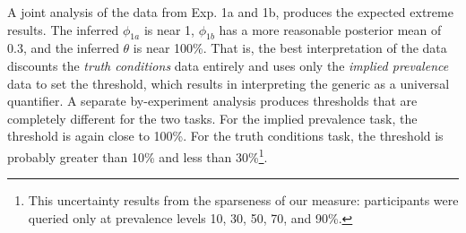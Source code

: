 \documentclass[10pt,letterpaper]{article}
\newcommand{\red}[1]{\textcolor{Red}{#1}}
\begin{document}
%
%	
%		
%			






A joint analysis of the data from Exp. 1a and 1b, produces the expected extreme results. The inferred $\phi_{1a}$ is near 1, $\phi_{1b}$ has a more reasonable posterior mean of 0.3, and the inferred $\theta$ is near 100\%. That is, the best interpretation of the data discounts the \emph{truth conditions} data entirely and uses only the \emph{implied prevalence} data to set the threshold, which results in interpreting the generic as a universal quantifier.
A separate by-experiment analysis produces thresholds that are completely different for the two tasks. 
For the implied prevalence task, the threshold is again close to 100\%. 
For the truth conditions task, the threshold is probably greater than 10\% and less than 30\%\footnote{This uncertainty results from the sparseness of our measure: participants were queried only at prevalence levels 10, 30, 50, 70, and 90\%.}.


\end{document}
